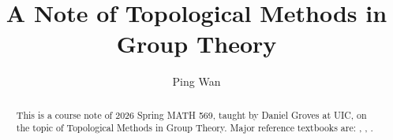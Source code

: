 \documentclass[12pt,oneside]{amsart}
\title{A Note of Topological Methods in Group Theory}
\author{Ping Wan}
\begin{document}
\begin{abstract}
    This is a course note of  2026 Spring MATH 569, taught by Daniel Groves at UIC, on the topic of Topological Methods in Group Theory. Major reference textbooks are: \cite{hatcher_algebraic_2001}, \cite{brown_cohomology_1982}, \cite{geoghegan_topological_2008}.
\end{abstract}
\maketitle


\tableofcontents

\newpage













\end{document}
